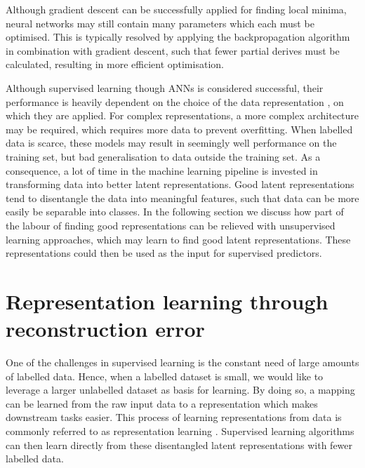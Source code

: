 Although gradient descent can be successfully applied for finding local minima, neural networks may still contain many parameters which each must be optimised. This is typically resolved by applying the backpropagation algorithm in combination with gradient descent, such that fewer partial derives must be calculated, resulting in more efficient optimisation.




Although supervised learning though ANNs is considered successful, their performance is heavily dependent on the choice of the data representation \cite{bengioRepresentationLearningReview2013}, on which they are applied. For complex representations, a more complex architecture may be required, which requires more data to prevent overfitting. When labelled data is scarce, these models may result in seemingly well performance on the training set, but bad generalisation to data outside the training set. As a consequence, a lot of time in the machine learning pipeline is invested in transforming data into better latent representations. Good latent representations tend to disentangle the data into meaningful features, such that data can be more easily be separable into classes. In the following section we discuss how part of the labour of finding good representations can be relieved with unsupervised learning approaches, which may learn to find good latent representations. These representations could then be used as the input for supervised predictors.




\section{Representation learning through reconstruction error}
One of the challenges in supervised learning is the constant need of large amounts of labelled data. Hence, when a labelled dataset is small, we would like to leverage a larger unlabelled dataset as basis for learning. By doing so, a mapping can be learned from the raw input data to a representation which makes downstream tasks easier. This process of learning representations from data is commonly referred to as representation learning \cite{le-khacContrastiveRepresentationLearning2020}. Supervised learning algorithms can then learn directly from these disentangled latent representations with fewer labelled data.

